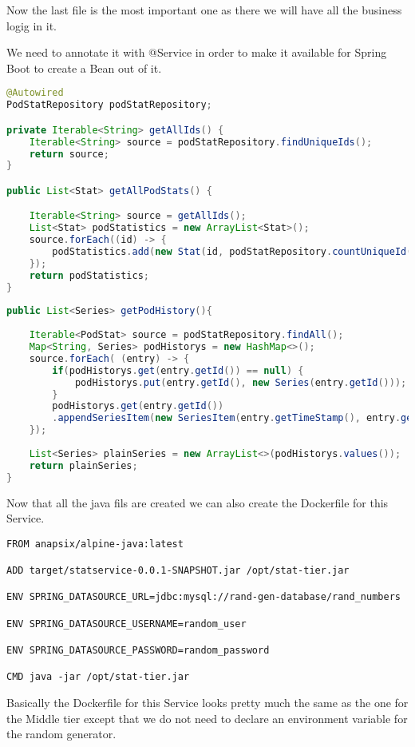 Now the last file is the most important one as there we will have all the business logig in it.

We need to annotate it with @Service in order to make it available for Spring Boot to create a Bean out of it.


\begin{lstlisting}[language=Java]
@Autowired
PodStatRepository podStatRepository;

private Iterable<String> getAllIds() {
	Iterable<String> source = podStatRepository.findUniqueIds();
	return source;
}

public List<Stat> getAllPodStats() {

	Iterable<String> source = getAllIds();
	List<Stat> podStatistics = new ArrayList<Stat>();
	source.forEach((id) -> {
		podStatistics.add(new Stat(id, podStatRepository.countUniqueId(id)));
	});
	return podStatistics;
}
	
public List<Series> getPodHistory(){
		
	Iterable<PodStat> source = podStatRepository.findAll();	
	Map<String, Series> podHistorys = new HashMap<>();	
	source.forEach( (entry) -> {				
		if(podHistorys.get(entry.getId()) == null) {			
			podHistorys.put(entry.getId(), new Series(entry.getId()));			
		}
		podHistorys.get(entry.getId())
		.appendSeriesItem(new SeriesItem(entry.getTimeStamp(), entry.getCounter()));							
	});
		
	List<Series> plainSeries = new ArrayList<>(podHistorys.values());
	return plainSeries;	
}
\end{lstlisting}

Now that all the java fils are created we can also create the Dockerfile for this Service.

\begin{lstlisting}
FROM anapsix/alpine-java:latest

ADD target/statservice-0.0.1-SNAPSHOT.jar /opt/stat-tier.jar

ENV SPRING_DATASOURCE_URL=jdbc:mysql://rand-gen-database/rand_numbers

ENV SPRING_DATASOURCE_USERNAME=random_user

ENV SPRING_DATASOURCE_PASSWORD=random_password

CMD java -jar /opt/stat-tier.jar

\end{lstlisting}

Basically the Dockerfile for this Service looks pretty much the same as the one for the Middle tier except that we do not need to declare an environment variable for the random generator.

